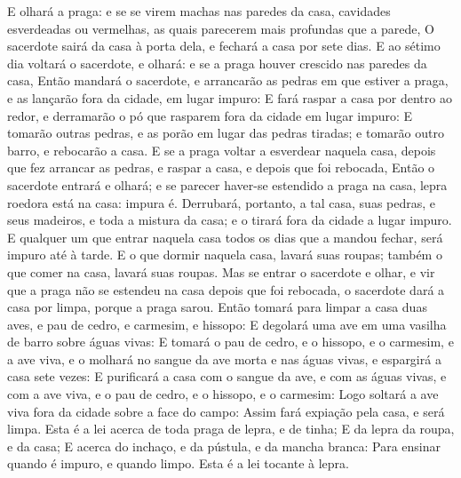{{  E olhará a praga: e se se virem machas nas paredes da casa, cavidades esverdeadas ou vermelhas, as quais parecerem mais profundas que a parede,
  O sacerdote sairá da casa à porta dela, e fechará a casa por sete dias.
  E ao sétimo dia voltará o sacerdote, e olhará: e se a praga houver crescido nas paredes da casa,
  Então mandará o sacerdote, e arrancarão as pedras em que estiver a praga, e as lançarão fora da cidade, em lugar impuro:
  E fará raspar a casa por dentro ao redor, e derramarão o pó que rasparem fora da cidade em lugar impuro:
  E tomarão outras pedras, e as porão em lugar das pedras tiradas; e tomarão outro barro, e rebocarão a casa.
  E se a praga voltar a esverdear naquela casa, depois que fez arrancar as pedras, e raspar a casa, e depois que foi rebocada,
  Então o sacerdote entrará e olhará; e se parecer haver-se estendido a praga na casa, lepra roedora está na casa: impura é.
  Derrubará, portanto, a tal casa, suas pedras, e seus madeiros, e toda a mistura da casa; e o tirará fora da cidade a lugar impuro.
  E qualquer um que entrar naquela casa todos os dias que a mandou fechar, será impuro até à tarde.
  E o que dormir naquela casa, lavará suas roupas; também o que comer na casa, lavará suas roupas.
  Mas se entrar o sacerdote e olhar, e vir que a praga não se estendeu na casa depois que foi rebocada, o sacerdote dará a casa por limpa, porque a praga sarou.
  Então tomará para limpar a casa duas aves, e pau de cedro, e carmesim, e hissopo:
  E degolará uma ave em uma vasilha de barro sobre águas vivas:
  E tomará o pau de cedro, e o hissopo, e o carmesim, e a ave viva, e o molhará no sangue da ave morta e nas águas vivas, e espargirá a casa sete vezes:
  E purificará a casa com o sangue da ave, e com as águas vivas, e com a ave viva, e o pau de cedro, e o hissopo, e o carmesim:
  Logo soltará a ave viva fora da cidade sobre a face do campo: Assim fará expiação pela casa, e será limpa.
  Esta é a lei acerca de toda praga de lepra, e de tinha;
  E da lepra da roupa, e da casa;
  E acerca do inchaço, e da pústula, e da mancha branca:
  Para ensinar quando é impuro, e quando limpo. Esta é a lei tocante à lepra}.
\par }

